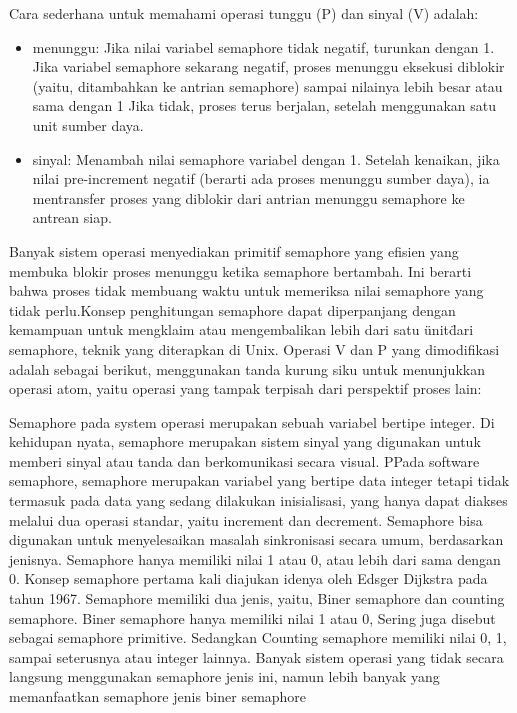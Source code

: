 		Cara sederhana untuk memahami operasi tunggu (P) dan sinyal (V) adalah:
		
		\begin{itemize}
		
			\item menunggu: Jika nilai variabel semaphore tidak negatif, turunkan dengan 1. Jika variabel semaphore sekarang negatif, proses menunggu eksekusi 
			      diblokir (yaitu, ditambahkan ke antrian semaphore) sampai nilainya lebih besar atau sama dengan 1 Jika tidak, proses terus berjalan, setelah 
				  menggunakan satu unit sumber daya.
			\item sinyal: Menambah nilai semaphore variabel dengan 1. Setelah kenaikan, jika nilai pre-increment negatif (berarti ada proses menunggu sumber 
				  daya), ia mentransfer proses yang diblokir dari antrian menunggu semaphore ke antrean siap.
			
		\end{itemize}
		
		Banyak sistem operasi menyediakan primitif semaphore yang efisien yang membuka blokir proses menunggu ketika semaphore bertambah. Ini berarti bahwa proses tidak membuang waktu untuk memeriksa nilai semaphore yang tidak perlu.Konsep penghitungan semaphore dapat diperpanjang dengan kemampuan untuk mengklaim atau mengembalikan lebih dari satu \"unit\" dari semaphore, teknik yang diterapkan di Unix. Operasi V dan P yang dimodifikasi adalah sebagai berikut, menggunakan tanda kurung siku untuk menunjukkan operasi atom, yaitu operasi yang tampak terpisah dari perspektif proses lain:

		Semaphore pada system operasi merupakan sebuah variabel bertipe integer. Di kehidupan nyata, semaphore merupakan sistem sinyal yang digunakan untuk memberi sinyal atau tanda dan berkomunikasi secara visual. PPada software semaphore, semaphore merupakan variabel yang bertipe data integer tetapi tidak termasuk pada data yang sedang dilakukan inisialisasi, yang hanya dapat diakses melalui dua operasi standar, yaitu increment dan decrement. 
		Semaphore bisa digunakan untuk menyelesaikan masalah sinkronisasi secara umum, berdasarkan jenisnya. Semaphore hanya memiliki nilai 1 atau 0, atau lebih dari sama dengan 0. Konsep semaphore pertama kali diajukan idenya oleh Edsger Dijkstra pada tahun 1967. Semaphore memiliki dua jenis, yaitu, Biner semaphore dan counting semaphore. Biner semaphore hanya memiliki nilai 1 atau 0, Sering juga disebut sebagai semaphore primitive. Sedangkan Counting semaphore memiliki nilai 0, 1, sampai seterusnya atau integer lainnya. Banyak sistem operasi yang tidak secara langsung menggunakan semaphore jenis ini, namun lebih banyak yang memanfaatkan semaphore jenis biner semaphore

